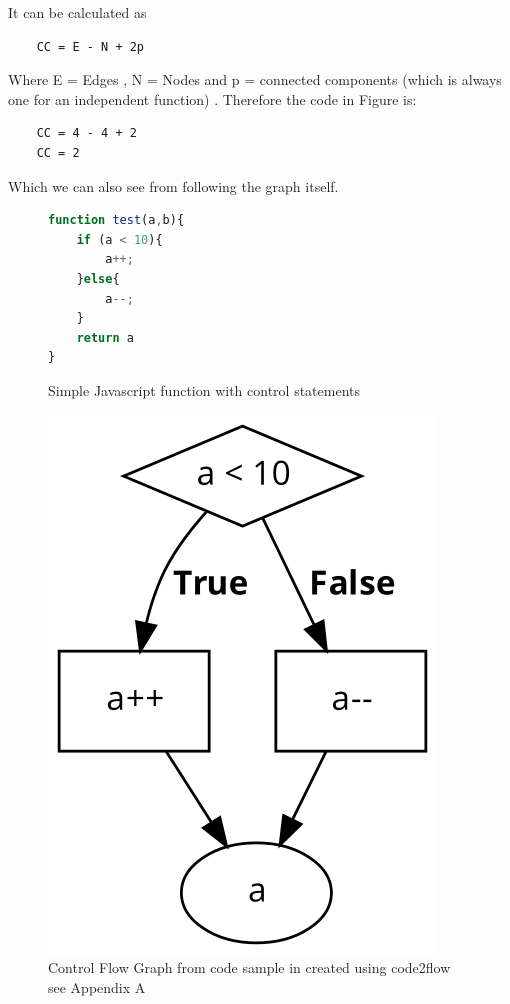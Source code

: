 \newline
It can be calculated as
\newline
\begin{verbatim}
    CC = E - N + 2p
\end{verbatim}
Where E = Edges , N = Nodes and p = connected components (which is always one for an independent function) \cite{cycloMaticComplexity}. Therefore the code in Figure  is:
\begin{verbatim}
    CC = 4 - 4 + 2
    CC = 2
\end{verbatim}
Which we can also see from following the graph itself.
\begin{figure}[h]
    \begin{lstlisting}[language=Javascript]
function test(a,b){
    if (a < 10){
        a++;
    }else{
        a--;
    }
    return a
}
                \end{lstlisting}
    \caption{Simple Javascript function with control statements}
    \label{fig:cfgcode}
\end{figure}
\begin{figure}[h]
    \includegraphics[width=.2\textwidth]{appendix/A/AppendixA.png}
    \caption{Control Flow Graph from code sample in  created using code2flow \cite{code2flow} see Appendix A}
    \label{fig:cfg}
\end{figure}

